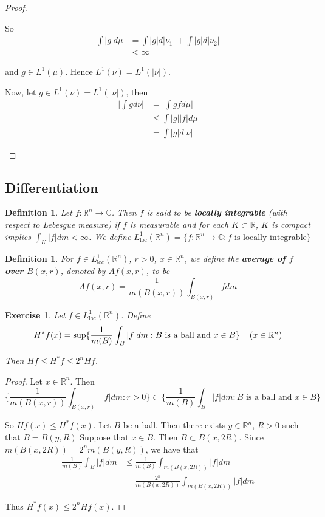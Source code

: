 \documentclass[12pt]{amsart}
\newtheorem{defn}[thm]{Definition}
\newtheorem{ex}[thm]{Exercise}
\newcommand{\C}{\mathbb{C}}
\newcommand{\R}{\mathbb{R}}
\newcommand{\Ll}{L^1_{\text{loc}}(\R^n)}
\begin{document}
\begin{proof}
\begin{enumerate}
		So 
		\begin{align*}
			\int |g| d\mu
			& =\int |g| d|\nu_1| + \int |g| d |\nu_2| \\
			& < \infty
		\end{align*}
		
		and $g \in L^1(\mu)$. Hence $L^1(\nu) = L^1(|\nu|)$. 
		
		Now, let $g \in L^1(\nu) = L^1(|\nu|)$, then 
		\begin{align*}
			\bigg| \int g d\nu \bigg| 
			&= \bigg| \int g f d\mu \bigg| \\
			& \leq \int |g||f|d\mu\\
			& = \int |g| d |\nu|
		\end{align*}
		
	\end{enumerate}
\end{proof}

\subsection{Differentiation}

\begin{defn}
	Let $f: \R^n \rightarrow \C$. Then $f$ is said to be \textbf{locally integrable} (with respect to Lebesgue measure) if $f$ is measurable and for each $K \subset \R$, $K$ is compact implies $\int_K |f| dm < \infty$. We define $L^1_{\text{loc}}(\R^n) = \{f:\R^n \rightarrow \C: f \text{ is locally integrable}\}$
\end{defn}

\begin{defn}
	For $f \in \Ll$, $r>0$, $x \in \R^n$, we define the \textbf{average of $f$ over $B(x,r)$}, denoted by $Af(x,r)$, to be $$Af(x,r) = \frac{1}{m(B(x,r))}\int_{B(x,r)}fdm$$
\end{defn}

\begin{ex}
	Let $f \in \Ll$. Define $$H^*f(x) = \sup\{\frac{1}{m(B)}\int_{B}|f|dm: B \text{ is a ball and } x \in B\} \hspace{4mm} (x \in \R^n)$$
	
	Then $Hf \leq H^*f \leq 2^n Hf$. 
\end{ex}

\begin{proof}
	Let $x \in \R^n$. Then $$\bigg \{ \frac{1}{m(B(x,r))}\int_{B(x,r)}|f|dm: r >0\bigg \} \subset \bigg\{ \frac{1}{m(B)}\int_{B}|f|dm: B \text{ is a ball and } x \in B \bigg\} $$
	
	So $Hf(x) \leq H^*f(x)$. Let $B$ be a ball. Then there exists $y \in \R^n$, $R>0$ such that $B = B(y,R)$ Suppose that $x \in B$. Then $B \subset B(x,2R)$. Since $m(B(x,2R)) = 2^n m(B(y,R))$, we have that 
	\begin{align*}
		\frac{1}{m(B)}\int_{B}|f|dm
		& \leq \frac{1}{m(B)} \int_{m(B(x,2R))}|f|dm\\
		&= \frac{2^n}{m(B(x,2R))} \int_{m(B(x,2R))}|f|dm
	\end{align*}
	
	Thus $H^*f(x) \leq 2^n Hf(x)$.
\end{proof}
\end{document}
